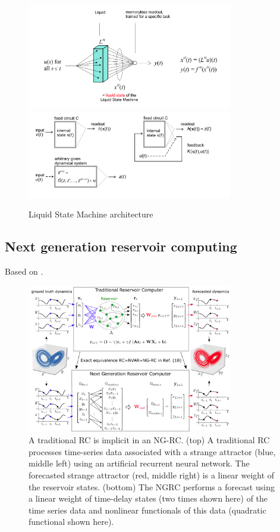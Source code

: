 \documentclass[11pt, oneside]{article}
\begin{document}
\begin{figure}
    \centering
    \includegraphics[width=0.8\textwidth]{figs/Liquid-state.png}
    \includegraphics[width=0.8\textwidth]{figs/liquid-state-2.png}

    \caption{Liquid State Machine architecture}
    \label{fig:lsm}
\end{figure}

\subsection{Next generation reservoir computing}
Based on \autocite{Gauthier2021}.

\begin{figure}[H]
    \centering
    \includegraphics[width=0.8\textwidth]{figs/next-generation.png}
    \caption{ A traditional RC is implicit in an NG-RC. (top) A traditional RC processes time-series data associated with a strange attractor (blue, middle left)
using an artificial recurrent neural network. The forecasted strange attractor (red, middle right) is a linear weight of the reservoir states. (bottom) The NGRC performs a forecast using a linear weight of time-delay states (two times shown here) of the time series data and nonlinear functionals of this data
(quadratic functional shown here).}
    \label{fig:ng-rc}
\end{figure}
\end{document}
